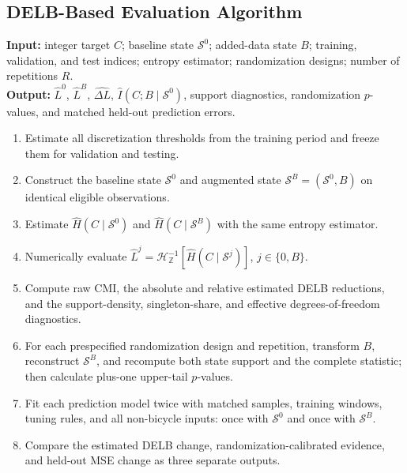 \subsection{DELB-Based Evaluation Algorithm}
\label{subsec:delb_evaluation_algorithm}

\begin{Algorithm}
\label{alg:delb_evaluation}
\textbf{Input:} integer target \(C\); baseline state \(\mathcal S^0\);
added-data state \(B\); training, validation, and test indices; entropy
estimator; randomization designs; number of repetitions \(R\).\\
\textbf{Output:} \(\widehat L^0\), \(\widehat L^B\),
\(\widehat{\Delta L}\), \(\widehat I(C;B\mid\mathcal S^0)\), support
diagnostics, randomization \(p\)-values, and matched held-out prediction
errors.
\begin{enumerate}
    \item Estimate all discretization thresholds from the training period
    and freeze them for validation and testing.
    \item Construct the baseline state \(\mathcal S^0\) and augmented state
    \(\mathcal S^B=(\mathcal S^0,B)\) on identical eligible observations.
    \item Estimate \(\widehat H(C\mid\mathcal S^0)\) and
    \(\widehat H(C\mid\mathcal S^B)\) with the same entropy estimator.
    \item Numerically evaluate
    \(\widehat L^j=\mathcal H_{\mathbb Z}^{-1}
    [\widehat H(C\mid\mathcal S^j)]\), \(j\in\{0,B\}\).
    \item Compute raw CMI, the absolute and relative estimated DELB
    reductions, and the support-density, singleton-share, and effective
    degrees-of-freedom diagnostics.
    \item For each prespecified randomization design and repetition, transform
    \(B\), reconstruct \(\mathcal S^B\), and recompute both state support and
    the complete statistic; then calculate plus-one upper-tail \(p\)-values.
    \item Fit each prediction model twice with matched samples, training
    windows, tuning rules, and all non-bicycle inputs: once with
    \(\mathcal S^0\) and once with \(\mathcal S^B\).
    \item Compare the estimated DELB change, randomization-calibrated evidence,
    and held-out MSE change as three separate outputs.
\end{enumerate}
\end{Algorithm}

